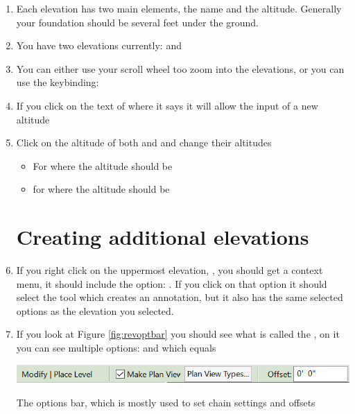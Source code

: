 \documentclass{tufte-book} %
\begin{document}
\begin{enumerate}
	\item Each elevation has two main elements, the name and the altitude. Generally your foundation should be several feet under the ground.
	\item You have two elevations currently:  and 
	\item You can either use your scroll wheel too zoom into the elevations, or you can use the keybinding: 
	\item If you click on the text of  where it says  it will allow the input of a new altitude
	\item Click on the altitude of both  and  and change their altitudes
	
	\begin{itemize}
		\item For  where the altitude should be 
		\item for  where the altitude should be 
	\end{itemize}
	
	\section{Creating additional elevations}
	\item If you right click on the uppermost elevation, , you should get a context menu, it should include the option: . If you click on that option it should select the  tool which creates an annotation, but it also has the same selected options as the elevation you selected.
	\item If you look at Figure \ref{fig:revoptbar} you should see what is called the , on it you can see multiple options:  and  which equals 
	
	\begin{marginfigure}
		\includegraphics[width=\linewidth]{revitoptionsbar.png}
		\caption[The revit options bar]{The options bar, which is mostly used to set chain settings and offsets}
		\label{fig:revoptbar}
	

\end{marginfigure}
\end{enumerate}
\end{document}
